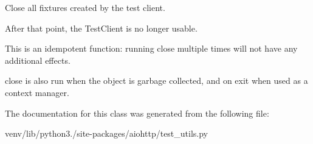 \begin{DoxyVerb}Close all fixtures created by the test client.

After that point, the TestClient is no longer usable.

This is an idempotent function: running close multiple times
will not have any additional effects.

close is also run when the object is garbage collected, and on
exit when used as a context manager.\end{DoxyVerb}
 

The documentation for this class was generated from the following file\+:\begin{DoxyCompactItemize}
\item 
venv/lib/python3./site-\/packages/aiohttp/test\+\_\+utils.\+py\end{DoxyCompactItemize}
